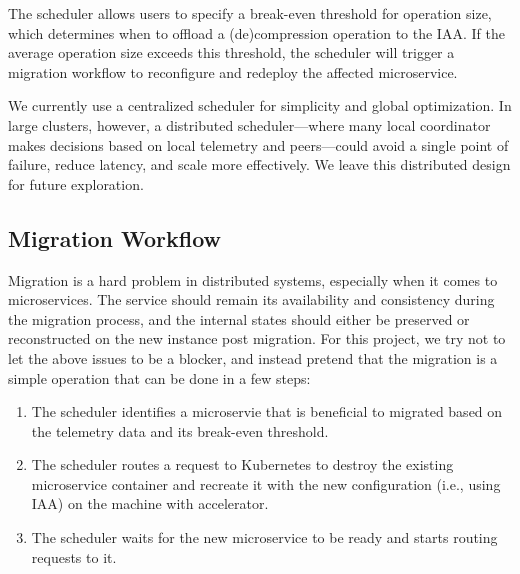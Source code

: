 The scheduler allows users to specify a break-even threshold for operation size, which determines when to offload a (de)compression operation to the IAA.
If the average operation size exceeds this threshold, the scheduler will trigger a migration workflow to reconfigure and redeploy the affected microservice.

We currently use a centralized scheduler for simplicity and global optimization.
In large clusters, however, a distributed scheduler---where many local coordinator makes decisions based on local telemetry and peers---could avoid a single point of failure, reduce latency, and scale more effectively.
We leave this distributed design for future exploration.

\subsection{Migration Workflow}


Migration is a hard problem in distributed systems, especially when it comes to microservices.
The service should remain its availability and consistency during the migration process, and the internal states should either be preserved or reconstructed on the new instance post migration.
For this project, we try not to let the above issues to be a blocker, and instead pretend that the migration is a simple operation that can be done in a few steps:
\begin{enumerate}
  \item The scheduler identifies a microservie that is beneficial to migrated based on the telemetry data and its break-even threshold.
  \item The scheduler routes a request to Kubernetes to destroy the existing microservice container and recreate it with the new configuration (i.e., using IAA) on the machine with accelerator.
  \item The scheduler waits for the new microservice to be ready and starts routing requests to it.
\end{enumerate}
